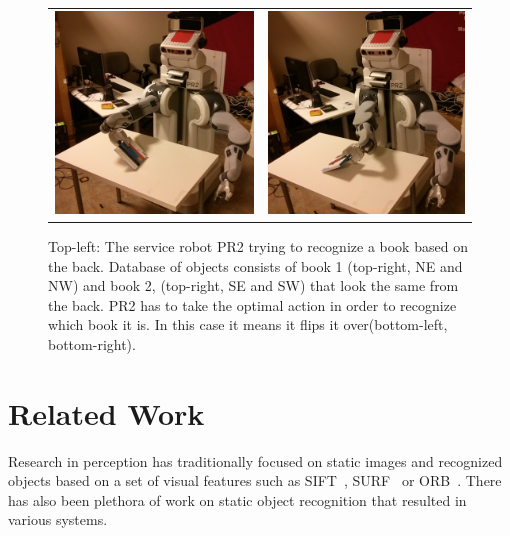 \documentclass[conference]{IEEEtran}
\begin{document}
\begin{figure}[ht]
\begin{tabular}{cccc}
    \multicolumn{2}{c}{\includegraphics[width=0.45\columnwidth]{pics/pr2_grasp.jpg}}
    & \multicolumn{2}{c}{\includegraphics[width=0.45\columnwidth]{pics/pr2_rotate.jpg}}
    \end{tabular}
    \caption{Top-left: The service robot PR2 trying to recognize a book based on the back. Database of objects consists of book 1 (top-right, NE and NW) and book 2, (top-right, SE and SW) that look the same from the back. PR2 has to take the optimal action in order to recognize which book it is. In this case it means it flips it over(bottom-left, bottom-right).}
    \label{fig:pr2}
    \end{figure}


\section{Related Work}



	Research in perception has traditionally focused on  static images and recognized objects based on a set of visual features such as SIFT~\cite{lowe2004distinctive}, SURF~\cite{bay2006surf} or ORB~\cite{rublee2011orb}.
    There has also been plethora of work on static object recognition that resulted in various systems.
	
\end{document}
